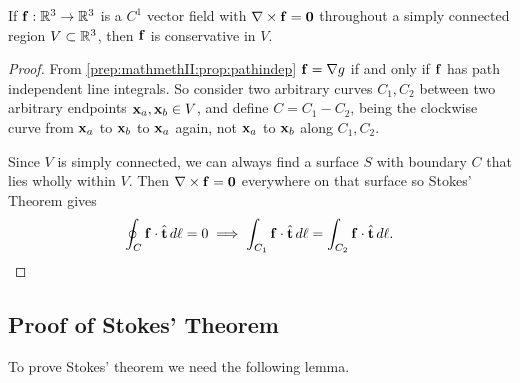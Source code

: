 \documentclass[10pt, a4paper]{article}
\begin{document}
\begin{corollary}
    If $\mathbf{f} : \mathbb{R} ^ 3 \to \mathbb{R} ^ 3$ is a $C ^ {1}$ vector field with $\mathbf{\nabla} \times \mathbf{f} = \mathbf{0}$ throughout a simply connected region $V \subset \mathbb{R} ^ 3$,
    then $\mathbf{f}$ is conservative in $V$.

    \begin{proof}
        From \autoref{prep:mathmethII:prop:pathindep} $\mathbf{f} = \mathbf{\nabla} g$ if and only if $\mathbf{f}$ has path independent line integrals.
        So consider two arbitrary curves $C_1, C_2$ between two arbitrary endpoints $\mathbf{x}_a, \mathbf{x}_b \in V$,
        and define $C = C_1 - C_2$,
        being the clockwise curve from $\mathbf{x}_a$ to $\mathbf{x}_b$ to $\mathbf{x}_a$ again,
        not $\mathbf{x}_a$ to $\mathbf{x}_b$ along $C_1, C_2$.

        Since $V$ is simply connected,
        we can always find a surface $S$ with boundary $C$ that lies wholly within $V$.
        Then $\mathbf{\nabla} \times \mathbf{f} = \mathbf{0}$ everywhere on that surface so Stokes' Theorem gives
        \[
        \oint_{C}\mathbf{f} \cdot \hat{\mathbf{t}}\,d\ell = 0 \implies \int_{C_1}\mathbf{f}\cdot\hat{\mathbf{t}}\,d\ell = \int_{C_2}\mathbf{f}\cdot\hat{\mathbf{t}}\,d\ell.
        \]
    \end{proof}
\end{corollary}

\subsection{Proof of Stokes' Theorem}
To prove Stokes' theorem we need the following lemma.
\end{document}
